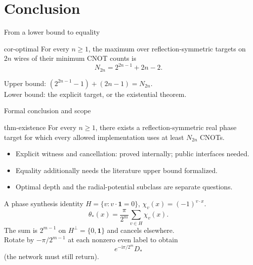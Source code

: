 \documentclass{beamer}
\begin{document}
\section{Conclusion}
\begin{frame}{From a lower bound to equality}
\begin{bookresult}{cor-optimal}
For every $n\geq1$, the maximum over reflection-symmetric targets on $2n$ wires of their minimum CNOT counts is
\[N_{2n}=2^{2n-1}+2n-2.\]
\end{bookresult}
Upper bound: $(2^{2n-1}-1)+(2n-1)=N_{2n}$.\\
Lower bound: the explicit target, or the existential theorem.
\end{frame}
\begin{frame}{Formal conclusion and scope}
\begin{bookresult}{thm-existence}
For every $n\geq1$, there exists a reflection-symmetric real phase target for which every allowed implementation uses at least $N_{2n}$ CNOTs.
\end{bookresult}
\begin{itemize}
\item Explicit witness and cancellation: proved internally; public interfaces needed.
\item Equality additionally needs the literature upper bound formalized.
\item Optimal depth and the radial-potential subclass are separate questions.
\end{itemize}
\end{frame}
\appendix
\begin{frame}{A phase synthesis identity}
$H=\{v:v\cdot\mathbf1=0\}$, $\chi_v(x)=(-1)^{v\cdot x}$.
\[\theta_*(x)=\frac{\pi}{2^m}\sum_{v\in H}\chi_v(x).\]
The sum is $2^{m-1}$ on $H^\perp=\{0,\mathbf1\}$ and cancels elsewhere.\\[.5em]
Rotate by $-\pi/2^{m-1}$ at each nonzero even label to obtain
\[e^{-\mathrm i\pi/2^m}D_*\]
(the network must still return).
\end{frame}
\end{document}
